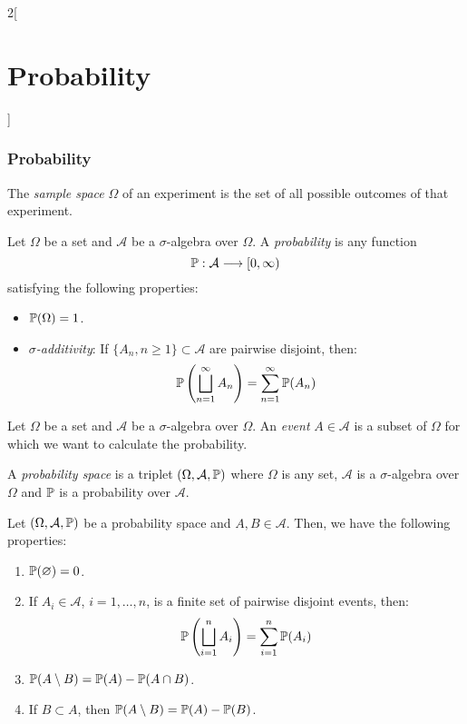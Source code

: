 \documentclass[../../../main.tex]{subfiles}
\begin{document}
\begin{multicols}{2}[\section{Probability}]
    \subsubsection{Probability}
    \begin{definition}
        The \textit{sample space} $\Omega$ of an experiment is the set of all possible outcomes of that experiment.
    \end{definition}
    \begin{definition}
        Let $\Omega$ be a set and $\mathcal{A}$ be a $\sigma$-algebra over $\Omega$. A \textit{probability} is any function $$\mathbb{P}:\mathcal{A}\longrightarrow[0,\infty)$$ satisfying the following properties:
        \begin{itemize}
            \item $\mathbb{P}(\Omega)=1$.
            \item \textit{$\sigma$-additivity}: If $\{A_n,n\geq1\}\subset\mathcal{A}$ are pairwise disjoint, then: $$\mathbb{P}\left(\bigsqcup_{n=1}^\infty A_n\right)=\sum_{n=1}^\infty \mathbb{P}(A_n)$$
        \end{itemize}
    \end{definition}
    \begin{definition}
        Let $\Omega$ be a set and $\mathcal{A}$ be a $\sigma$-algebra over $\Omega$. An \textit{event} $A\in\mathcal{A}$ is a subset of $\Omega$ for which we want to calculate the probability.
    \end{definition}
    \begin{definition}
        A \textit{probability space} is a triplet $(\Omega,\mathcal{A},\mathbb{P})$ where $\Omega$ is any set, $\mathcal{A}$ is a $\sigma$-algebra over $\Omega$ and $\mathbb{P}$ is a probability over $\mathcal{A}$.
    \end{definition}
    \begin{prop}
        Let $(\Omega,\mathcal{A},\mathbb{P})$ be a probability space and $A,B\in\mathcal{A}$. Then, we have the following properties:
        \begin{enumerate}
            \item $\mathbb{P}(\varnothing)=0$.
            \item If $A_i\in\mathcal{A}$, $i=1,\ldots,n$, is a finite set of pairwise disjoint events, then: $$\mathbb{P}\left(\bigsqcup_{i=1}^n A_i\right)=\sum_{i=1}^n \mathbb{P}(A_i)$$
            \item $\mathbb{P}(A\setminus B) =\mathbb{P}(A)-\mathbb{P}(A\cap B)$.
            \item If $B\subset A$, then $\mathbb{P}(A\setminus B)=\mathbb{P}(A)-\mathbb{P}(B)$.

\end{enumerate}
\end{prop}
\end{multicols}
\end{document}
